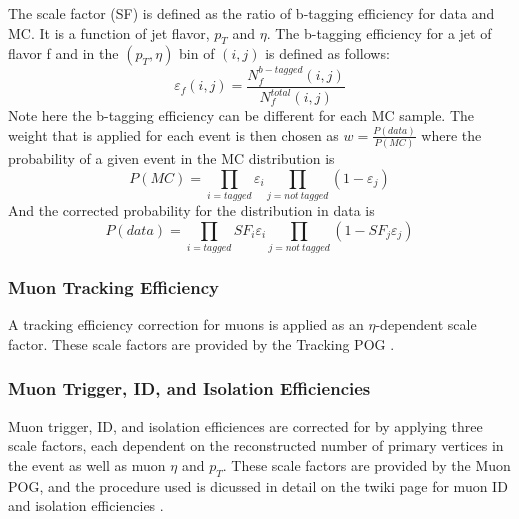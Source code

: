 \documentclass{cmspaperpdf}
\begin{document}
The scale factor (SF) is defined as the ratio of b-tagging efficiency for data and  MC. It is a function of jet flavor, $p_{T}$ and $\eta$. The b-tagging efficiency for a jet of flavor f and in the $(p_{T},\eta)$ bin of $(i,j)$ is defined as follows:
\begin{equation}
\varepsilon_{f} (i,j)=\frac{N_{f}^{b-tagged}(i,j)}{N_{f}^{total}(i,j)}
\end{equation}
Note here the b-tagging efficiency can be different for each MC sample. The weight that is applied for each event is then chosen as $w = \frac{P(data)}{P(MC)}$ where the probability of a given event in the MC distribution is
\begin{equation}
P(MC)=\prod_{i=tagged}\varepsilon _{i}\prod_{j=not\: tagged}(1-\varepsilon_{j})
\end{equation}
And the corrected probability for the distribution in data is
\begin{equation}
P(data)=\prod_{i=tagged}SF_{i}\varepsilon _{i}\prod_{j=not\: tagged}(1-SF_{j}\varepsilon_{j})
\end{equation}


\subsubsection{Muon Tracking Efficiency}

A tracking efficiency correction for muons is applied as an $\eta$-dependent scale factor. These scale factors are provided by the Tracking POG \cite{tracking_POG}.

\subsubsection{Muon Trigger, ID, and Isolation Efficiencies}

Muon trigger, ID, and isolation efficiences are corrected for by applying three scale factors, each dependent on the reconstructed number of primary vertices in the event as well as muon $\eta$ and $p_T$. These scale factors are provided by the Muon POG, and the procedure used is dicussed in detail on the twiki page for muon ID and isolation efficiencies \cite{muon_eff_twiki}.
\end{document}

